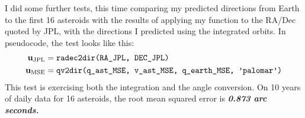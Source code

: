 I did some further tests, this time comparing my predicted directions from Earth to the first 16 asteroids 
with the results of applying my  function to the RA/Dec quoted by JPL,
with the directions I predicted using the integrated orbits.  In pseudocode, the test looks like this:
\begin{align*}
\mathbf{u}_{\mathrm{JPL}} &= \texttt{radec2dir(RA\_JPL, DEC\_JPL)} \\
\mathbf{u}_{\mathrm{MSE}} &= \texttt{qv2dir(q\_ast\_MSE, v\_ast\_MSE, q\_earth\_MSE, 'palomar')}
\end{align*}
This test is exercising both the integration and the angle conversion.
On 10 years of daily data for 16 asteroids, the root mean squared error is \textbf{\emph{0.873 arc seconds.}}

